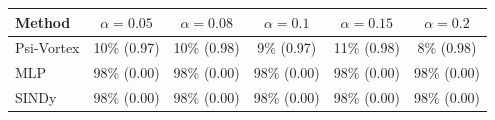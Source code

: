 \begin{tabular}{lccccc}
\toprule
Method & $\alpha=0.05$ & $\alpha=0.08$ & $\alpha=0.1$ & $\alpha=0.15$ & $\alpha=0.2$ \\
\midrule
Psi-Vortex & 10\% (0.97) & 10\% (0.98) & 9\% (0.97) & 11\% (0.98) & 8\% (0.98) \\
MLP & 98\% (0.00) & 98\% (0.00) & 98\% (0.00) & 98\% (0.00) & 98\% (0.00) \\
SINDy & 98\% (0.00) & 98\% (0.00) & 98\% (0.00) & 98\% (0.00) & 98\% (0.00) \\
\bottomrule
\end{tabular}
